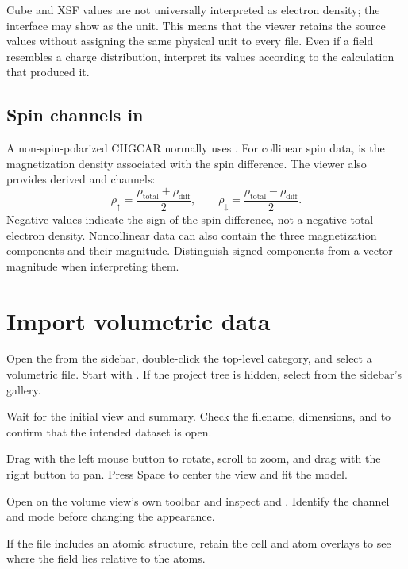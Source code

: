 Cube and XSF values are not universally interpreted as electron density; the interface may show  as the unit. This means that the viewer retains the source values without assigning the same physical unit to every file. Even if a field resembles a charge distribution, interpret its values according to the calculation that produced it.

\subsection{Spin channels in }

A non-spin-polarized CHGCAR normally uses . For collinear spin data,  is the magnetization density associated with the spin difference. The viewer also provides derived  and  channels:
\[
  \rho_{\uparrow}=\frac{\rho_{\mathrm{total}}+\rho_{\mathrm{diff}}}{2},
  \qquad
  \rho_{\downarrow}=\frac{\rho_{\mathrm{total}}-\rho_{\mathrm{diff}}}{2}.
\]
Negative  values indicate the sign of the spin difference, not a negative total electron density. Noncollinear data can also contain the three magnetization components and their magnitude. Distinguish signed components from a vector magnitude when interpreting them.

\section{Import volumetric data}

\begin{steps}
  \item Open the  from the sidebar, double-click the top-level  category, and select a volumetric file. Start with . If the project tree is hidden, select  from the sidebar's  gallery.
  \item Wait for the initial view and summary. Check the filename,  dimensions, and  to confirm that the intended dataset is open.
  \item Drag with the left mouse button to rotate, scroll to zoom, and drag with the right button to pan. Press Space to center the view and fit the model.
  \item Open  on the volume view's own toolbar and inspect  and . Identify the channel and mode before changing the appearance.
  \item If the file includes an atomic structure, retain the cell and atom overlays to see where the field lies relative to the atoms.
\end{steps}

